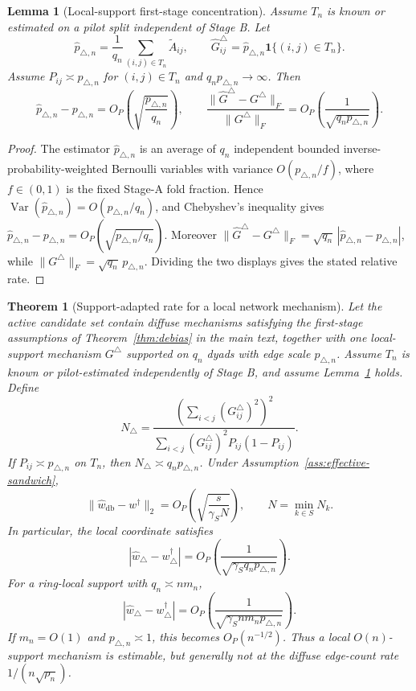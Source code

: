 \documentclass[12pt]{article}
\newtheorem{theorem}{Theorem}
\newtheorem{lemma}{Lemma}
\newcommand{\1}{\mathbf{1}}
\begin{document}
\begin{lemma}[Local-support first-stage concentration]
\label{lem:local-support-first-stage}
Assume \(T_n\) is known or estimated on a pilot split independent of Stage B.
Let
\[
    \widehat p_{\triangle,n}
    =
    \frac{1}{q_n}\sum_{(i,j)\in T_n}\widetilde A_{ij},
    \qquad
    \widehat G^\triangle_{ij}
    =
    \widehat p_{\triangle,n}\mathbf 1\{(i,j)\in T_n\}.
\]
Assume \(P_{ij}\asymp p_{\triangle,n}\) for \((i,j)\in T_n\) and
\(q_np_{\triangle,n}\to\infty\). Then
\[
    \widehat p_{\triangle,n}-p_{\triangle,n}
    =
    O_P\!\left(
        \sqrt{\frac{p_{\triangle,n}}{q_n}}
    \right),
    \qquad
    \frac{\|\widehat G^\triangle-G^\triangle\|_F}
         {\|G^\triangle\|_F}
    =
    O_P\!\left(
        \frac{1}{\sqrt{q_np_{\triangle,n}}}
    \right).
\]
\end{lemma}

\begin{proof}
The estimator \(\widehat p_{\triangle,n}\) is an average of \(q_n\)
independent bounded inverse-probability-weighted Bernoulli variables with
variance \(O(p_{\triangle,n}/f)\), where \(f\in(0,1)\) is the fixed Stage-A
fold fraction. Hence \(\operatorname{Var}(\widehat p_{\triangle,n})=O(p_{\triangle,n}/q_n)\),
and Chebyshev's inequality gives \(\widehat p_{\triangle,n}-p_{\triangle,n}=O_P(\sqrt{p_{\triangle,n}/q_n})\).
Moreover \(\|\widehat G^\triangle-G^\triangle\|_F=\sqrt{q_n}\,|\widehat p_{\triangle,n}-p_{\triangle,n}|\),
while \(\|G^\triangle\|_F=\sqrt{q_n}\,p_{\triangle,n}\). Dividing the two
displays gives the stated relative rate.
\end{proof}

\begin{theorem}[Support-adapted rate for a local network mechanism]
\label{thm:local-support-rate}
Let the active candidate set contain diffuse mechanisms satisfying the
first-stage assumptions of Theorem~\ref{thm:debias} in the main text, together with one
local-support mechanism \(G^\triangle\) supported on \(q_n\) dyads with edge
scale \(p_{\triangle,n}\). Assume \(T_n\) is known or pilot-estimated
independently of Stage B, and assume Lemma~\ref{lem:local-support-first-stage}
holds. Define
\[
    N_\triangle
    =
    \frac{
        \left(\sum_{i<j}(G^\triangle_{ij})^2\right)^2
    }{
        \sum_{i<j}(G^\triangle_{ij})^2P_{ij}(1-P_{ij})
    }.
\]
If \(P_{ij}\asymp p_{\triangle,n}\) on \(T_n\), then
\(N_\triangle\asymp q_np_{\triangle,n}\). Under
Assumption~\ref{ass:effective-sandwich},
\[
    \|\widehat w_{\mathrm{db}}-w^\dagger\|_2
    =
    O_P\!\left(
        \sqrt{\frac{s}{\gamma_S N}}
    \right),
    \qquad
    N=\min_{k\in S}N_k.
\]
In particular, the local coordinate satisfies
\[
    |\widehat w_\triangle-w^\dagger_\triangle|
    =
    O_P\!\left(
        \frac{1}{\sqrt{\gamma_S q_np_{\triangle,n}}}
    \right).
\]
For a ring-local support with \(q_n\asymp nm_n\),
\[
    |\widehat w_\triangle-w^\dagger_\triangle|
    =
    O_P\!\left(
        \frac{1}{\sqrt{\gamma_S nm_np_{\triangle,n}}}
    \right).
\]
If \(m_n=O(1)\) and \(p_{\triangle,n}\asymp1\), this becomes \(O_P(n^{-1/2})\).
Thus a local \(O(n)\)-support mechanism is estimable, but generally not at the
diffuse edge-count rate \(1/(n\sqrt{\rho_n})\).
\end{theorem}
\end{document}

